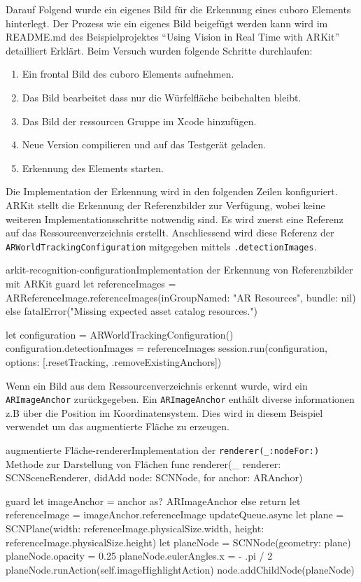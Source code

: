 \begin{description}
	Darauf Folgend wurde ein eigenes Bild für die Erkennung eines cuboro Elements hinterlegt. Der Prozess wie ein eigenes Bild beigefügt werden kann wird im README.md des Beispielprojektes "`Using Vision in Real Time with ARKit"' detailliert Erklärt. Beim Versuch wurden folgende Schritte durchlaufen:

	\begin{enumerate}
		\item Ein frontal Bild des cuboro Elements aufnehmen. 
		\item Das Bild bearbeitet dass nur die Würfelfläche beibehalten bleibt.
		\item Das Bild der ressourcen Gruppe im Xcode hinzufügen.
		\item Neue Version compilieren und auf das Testgerät geladen.
		\item Erkennung des Elements starten.  
	\end{enumerate}



	Die Implementation der Erkennung wird in den folgenden Zeilen konfiguriert. ARKit stellt die Erkennung der Referenzbilder zur Verfügung, wobei keine weiteren Implementationsschritte notwendig sind. Es wird zuerst eine Referenz auf das Ressourcenverzeichnis erstellt. Anschliessend wird diese Referenz der \texttt{ARWorldTrackingConfiguration} mitgegeben mittels \texttt{.detectionImages}.
	\begin{code}{arkit-recognition-configuration}{Implementation der Erkennung von Referenzbilder mit ARKit}
	guard let referenceImages = ARReferenceImage.referenceImages(inGroupNamed: "AR Resources", bundle: nil) else {
		fatalError("Missing expected asset catalog resources.")
	}
	
	let configuration = ARWorldTrackingConfiguration()
	configuration.detectionImages = referenceImages
	session.run(configuration, options: [.resetTracking, .removeExistingAnchors])
	\end{code}

	Wenn ein Bild aus dem Ressourcenverzeichnis erkennt wurde, wird ein \texttt{ARImageAnchor} zurückgegeben. Ein \texttt{ARImageAnchor} enthält diverse informationen z.B über die Position im Koordinatensystem. Dies wird in diesem Beispiel verwendet um das augmentierte Fläche zu erzeugen. 

	\begin{code}{augmentierte Fläche-renderer}{Implementation der \texttt{renderer(\_:nodeFor:)} Methode zur Darstellung von Flächen}
		func renderer(_ renderer: SCNSceneRenderer, didAdd node: SCNNode, for anchor: ARAnchor) {
			guard let imageAnchor = anchor as? ARImageAnchor else { return }
			let referenceImage = imageAnchor.referenceImage
			updateQueue.async {
				let plane = SCNPlane(width: referenceImage.physicalSize.width,
									height: referenceImage.physicalSize.height)
				let planeNode = SCNNode(geometry: plane)
				planeNode.opacity = 0.25
				planeNode.eulerAngles.x =  - .pi / 2
				planeNode.runAction(self.imageHighlightAction)
				node.addChildNode(planeNode)
			}

}
\end{code}
\end{description}
